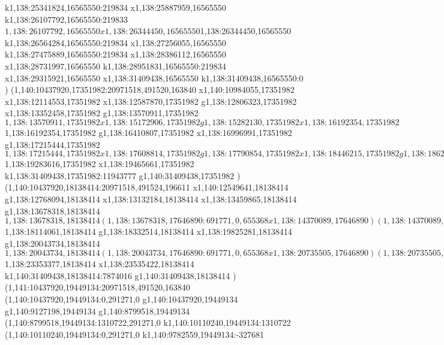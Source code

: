 {k1,138:25341824,16565550:219834
x1,138:25887959,16565550
k1,138:26107792,16565550:219833
$1,138:26107792,16565550
x1,138:26344450,16565550
$1,138:26344450,16565550
k1,138:26564284,16565550:219834
x1,138:27256055,16565550
k1,138:27475889,16565550:219834
x1,138:28386112,16565550
x1,138:28731997,16565550
k1,138:28951831,16565550:219834
x1,138:29315921,16565550
x1,138:31409438,16565550
k1,138:31409438,16565550:0
)
(1,140:10437920,17351982:20971518,491520,163840
x1,140:10984055,17351982
x1,138:12114553,17351982
x1,138:12587870,17351982
g1,138:12806323,17351982
x1,138:13352458,17351982
g1,138:13570911,17351982
$1,138:13570911,17351982
x1,138:15172906,17351982
g1,138:15282130,17351982
x1,138:16192354,17351982
$1,138:16192354,17351982
g1,138:16410807,17351982
x1,138:16996991,17351982
g1,138:17215444,17351982
$1,138:17215444,17351982
x1,138:17608814,17351982
g1,138:17790854,17351982
x1,138:18446215,17351982
g1,138:18628255,17351982
x1,138:19283616,17351982
$1,138:19283616,17351982
x1,138:19465661,17351982
k1,138:31409438,17351982:11943777
g1,140:31409438,17351982
)
(1,140:10437920,18138414:20971518,491524,196611
x1,140:12549641,18138414
g1,138:12768094,18138414
x1,138:13132184,18138414
x1,138:13459865,18138414
g1,138:13678318,18138414
$1,138:13678318,18138414
(1,138:13678318,17646890:691771,0,655368
x1,138:14370089,17646890
)
(1,138:14370089,18335025:356734,197518,0
x1,138:14694055,18335025
)
g1,138:14836047,18138414
x1,138:15102060,18138414
(1,138:15102060,17900589:356734,197518,0
x1,138:15426026,17900589
)
x1,138:16011527,18138414
(1,138:16046115,17900589:356734,197518,0
x1,138:16370081,17900589
)
x1,138:16584894,18138414
g1,138:16766934,18138414
x1,138:17276660,18138414
g1,138:17458700,18138414
x1,138:18114061,18138414
$1,138:18114061,18138414
g1,138:18332514,18138414
x1,138:19825281,18138414
g1,138:20043734,18138414
$1,138:20043734,18138414
(1,138:20043734,17646890:691771,0,655368
x1,138:20735505,17646890
)
(1,138:20735505,18335025:356734,197518,0
x1,138:21059471,18335025
)
g1,138:21201463,18138414
x1,138:21467476,18138414
(1,138:21467476,17900589:356734,197518,0
x1,138:21791442,17900589
)
g1,138:22006250,18138414
x1,138:22515976,18138414
g1,138:22698016,18138414
x1,138:23353377,18138414
$1,138:23353377,18138414
x1,138:23535422,18138414
k1,140:31409438,18138414:7874016
g1,140:31409438,18138414
)
(1,141:10437920,19449134:20971518,491520,163840
(1,140:10437920,19449134:0,291271,0
g1,140:10437920,19449134
g1,140:9127198,19449134
g1,140:8799518,19449134
(1,140:8799518,19449134:1310722,291271,0
k1,140:10110240,19449134:1310722
(1,140:10110240,19449134:0,291271,0
k1,140:9782559,19449134:-327681
}
